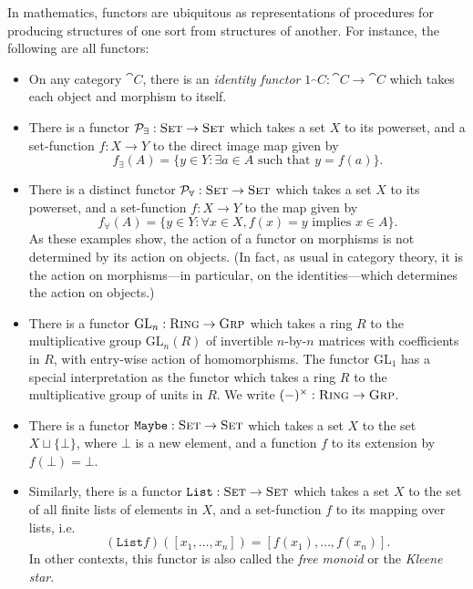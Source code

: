\begin{ex}\label{ex:functors}
  In mathematics, functors are ubiquitous as representations of procedures for
  producing structures of one sort from structures of another. For instance, the
  following are all functors:
  \begin{itemize}
    \item On any category $\cat{C}$, there is an \emph{identity functor}
      $1_\cat{C}: \cat{C}\to\cat{C}$ which takes each object and morphism to
      itself.
    \item There is a functor $\mathcal{P}_\exists: {\textsc{\text{Set}}}\to{\textsc{\text{Set}}}$ which takes
      a set $X$ to its powerset, and a set-function $f: X\to Y$ to the direct
      image map given by \[
        f_\exists(A) = \{y\in Y: \exists a\in A \text{ such that } y = f(a)\}.
      \]
    \item There is a distinct functor $\mathcal{P}_\forall: {\textsc{\text{Set}}}\to{\textsc{\text{Set}}}$
      which takes a set $X$ to its powerset, and a set-function $f: X\to Y$ to
      the map given by \[
        f_\forall(A) = \{y\in Y: \forall x\in X, f(x) = y \text{ implies } x\in A\}.
      \] As these examples show, the action of a functor on morphisms is not
      determined by its action on objects. (In fact, as usual in category
      theory, it is the action on morphisms---in particular, on the
      identities---which determines the action on objects.)
    \item There is a functor $\text{GL}_n: {\textsc{\text{Ring}}}\to{\textsc{\text{Grp}}}$ which takes a
      ring $R$ to the multiplicative group $\text{GL}_n(R)$ of invertible $n$-by-$n$
      matrices with coefficients in $R$, with entry-wise action of homomorphisms.
      The functor $\text{GL}_1$ has a special interpretation as the functor
      which takes a ring $R$ to the multiplicative group of units in $R$. We
      write $(-)^\times: {\textsc{\text{Ring}}}\to{\textsc{\text{Grp}}}$.
    \item There is a functor $\texttt{Maybe}: {\textsc{\text{Set}}}\to{\textsc{\text{Set}}}$ which takes a
      set $X$ to the set $X\sqcup \{\bot\}$, where $\bot$ is a new element, and
      a function $f$ to its extension by $f(\bot) = \bot$.
    \item Similarly, there is a functor $\texttt{List}: {\textsc{\text{Set}}}\to{\textsc{\text{Set}}}$ which
      takes a set $X$ to the set of all finite lists of elements in $X$, and a
      set-function $f$ to its mapping over lists, i.e. \[
        (\texttt{List}f)([x_1, \ldots, x_n]) = [f(x_1), \ldots, f(x_n)].
      \]  In other contexts, this functor is also called the \emph{free
      monoid} or the \emph{Kleene star}.

\end{itemize}
\end{ex}
